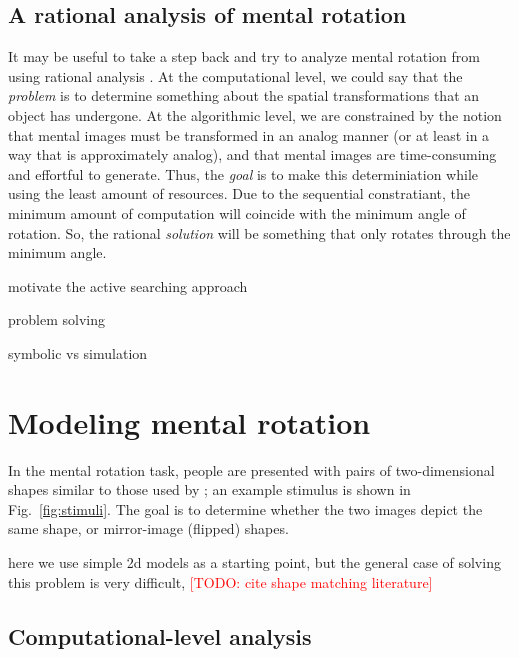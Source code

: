 \documentclass[10pt,letterpaper]{article}
\newcommand{\TODO}[1]{\textcolor{red}{[TODO: #1]}}
\begin{document}
\subsection{A rational analysis of mental rotation}

It may be useful to take a step back and try to analyze mental
rotation from using rational analysis
\cite{Marr:1983to,anderson90,Shepard:1987tt}. At the computational
level, we could say that the \textit{problem} is to determine
something about the spatial transformations that an object has
undergone. At the algorithmic level, we are constrained by the notion
that mental images must be transformed in an analog manner (or at
least in a way that is approximately analog), and that mental images
are time-consuming and effortful to generate. Thus, the \textit{goal}
is to make this determiniation while using the least amount of
resources. Due to the sequential constratiant, the minimum amount of
computation will coincide with the minimum angle of rotation. So, the
rational \textit{solution} will be something that only rotates through
the minimum angle.

motivate the active searching approach
\cite{Gureckis:2012gu,Markant:2012uu} \cite{Markant:2012uu,Nelson2007}

problem solving \cite{Hegarty2004, Schwartz1999}

symbolic vs simulation \cite{Schwartz:1996uy}

\section{Modeling mental rotation}

In the mental rotation task, people are presented with pairs of
two-dimensional shapes similar to those used by ;
an example stimulus is shown in Fig.~\ref{fig:stimuli}. The goal is to
determine whether the two images depict the same shape, or
mirror-image (flipped) shapes.

here we use simple 2d models as a starting point, but the general case
of solving this problem is very difficult, \TODO{cite shape matching
  literature}

\subsection{Computational-level analysis}
\end{document}
